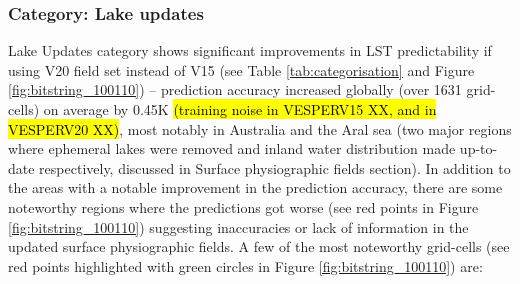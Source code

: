 \documentclass[hess, twostagejnl]{copernicus}
\begin{document}
\subsubsection{Category: Lake updates}
Lake Updates category shows significant improvements in LST predictability if using V20 field set instead of V15 (see Table \ref{tab:categorisation} and Figure \ref{fig:bitstring_100110}) – prediction accuracy increased globally (over 1631 grid-cells) on average by 0.45K \hl{(training noise in VESPERV15 XX, and in VESPERV20 XX)}, most notably in Australia and the Aral sea (two major regions where ephemeral lakes were removed and inland water distribution made up-to-date respectively, discussed in Surface physiographic fields section). In addition to the areas with a notable improvement in the prediction accuracy, there are some noteworthy regions where the predictions got worse (see red points in Figure \ref{fig:bitstring_100110}) suggesting inaccuracies or lack of information in the updated surface physiographic fields. A few of the most noteworthy grid-cells (see red points highlighted with green circles in Figure \ref{fig:bitstring_100110}) are:
\end{document}
